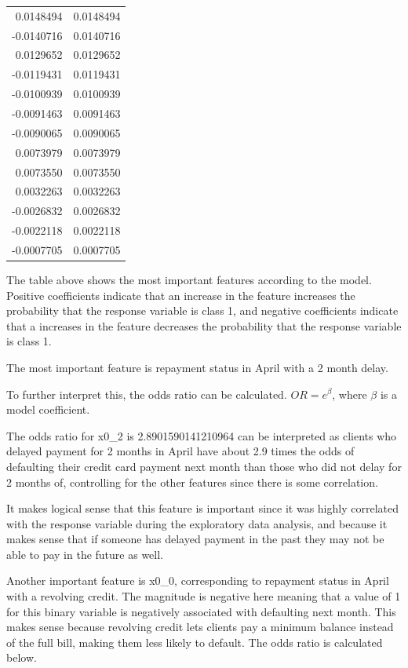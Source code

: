 \documentclass[
]{article}
\begin{document}
\begin{longtable}[]{@{}rr@{}}
0.0148494 & 0.0148494 \\
-0.0140716 & 0.0140716 \\
0.0129652 & 0.0129652 \\
-0.0119431 & 0.0119431 \\
-0.0100939 & 0.0100939 \\
-0.0091463 & 0.0091463 \\
-0.0090065 & 0.0090065 \\
0.0073979 & 0.0073979 \\
0.0073550 & 0.0073550 \\
0.0032263 & 0.0032263 \\
-0.0026832 & 0.0026832 \\
-0.0022118 & 0.0022118 \\
-0.0007705 & 0.0007705 \\
\bottomrule
\end{longtable}

The table above shows the most important features according to the
model. Positive coefficients indicate that an increase in the feature
increases the probability that the response variable is class 1, and
negative coefficients indicate that a increases in the feature decreases
the probability that the response variable is class 1.

The most important feature is repayment status in April with a 2 month
delay.

To further interpret this, the odds ratio can be calculated.
\(OR = e^{\beta}\), where \(\beta\) is a model coefficient.

The odds ratio for x0\_2 is 2.8901590141210964 can be interpreted as
clients who delayed payment for 2 months in April have about 2.9 times
the odds of defaulting their credit card payment next month than those
who did not delay for 2 months of, controlling for the other features
since there is some correlation.

It makes logical sense that this feature is important since it was
highly correlated with the response variable during the exploratory data
analysis, and because it makes sense that if someone has delayed payment
in the past they may not be able to pay in the future as well.

Another important feature is x0\_0, corresponding to repayment status in
April with a revolving credit. The magnitude is negative here meaning
that a value of 1 for this binary variable is negatively associated with
defaulting next month. This makes sense because revolving credit lets
clients pay a minimum balance instead of the full bill, making them less
likely to default. The odds ratio is calculated below.
\end{document}
